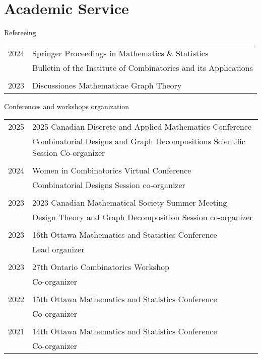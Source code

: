 \documentclass[letter,12pt]{article} %
\begin{document}
\section{Academic Service}
\vspace{3mm}
{\large Refereeing}

{\raggedleft
\begin{tabular}{r | l}
2024 &  Springer Proceedings in Mathematics \& Statistics\\
& Bulletin of the Institute of Combinatorics and its Applications\\
\multicolumn{1}{c}{} &\multicolumn{1}{c}{} \\[-3mm]
2023& Discussiones Mathematicae Graph Theory\\
\end{tabular}}

{\large Conferences and workshops organization}

\begin{longtable}{r p{13.5cm}}
2025 & 2025 Canadian Discrete and Applied Mathematics Conference \\
&Combinatorial Designs and Graph Decompositions Scientific Session Co-organizer \\
& \\[-3mm]
 2024 &  Women in Combinatorics Virtual Conference   \\
&Combinatorial Designs Session co-organizer \\
& \\[-3mm]
 2023 & 2023 Canadian Mathematical Society Summer Meeting  \\
&Design Theory and Graph Decomposition Session co-organizer \\
& \\[-3mm]
2023 & 16th Ottawa Mathematics and Statistics Conference  \\
& Lead organizer\\
\\[-3mm]
2023 & 27th Ontario Combinatorics Workshop \\
& Co-organizer \\
\\[-3mm]
2022 & 15th Ottawa Mathematics and Statistics Conference  \\
& Co-organizer\\
\\[-3mm]
2021 & 14th Ottawa Mathematics and Statistics Conference  \\
& Co-organizer\\
\end{longtable}
\end{document}
